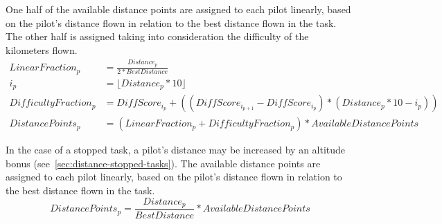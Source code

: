 \documentclass{article}
\begin{document}
\begin{hg}
One half of the available distance points are assigned to each pilot linearly,
based on the pilot’s distance flown in relation to the best distance flown in
the task. The other half is assigned taking into consideration the difficulty
of the kilometers flown.
\begin{align*}
    LinearFraction_p &= \frac{Distance_p}{2 * BestDistance} \\
    i_p &= \lfloor Distance_p * 10 \rfloor \\
    DifficultyFraction_p &= DiffScore_{i_p} + ((DiffScore_{i_{p + 1}} - DiffScore_{i_p}) * (Distance_p * 10 - i_p)) \\
    DistancePoints_p &= (LinearFraction_p + DifficultyFraction_p) * AvailableDistancePoints
\end{align*}
\end{hg}

\begin{pg}
In the case of a stopped task, a pilot’s distance may be increased by an
altitude bonus (see~\ref{sec:distance-stopped-tasks}). The available distance
points are assigned to each pilot linearly, based on the pilot’s distance flown
in relation to the best distance flown in the task.
\[ DistancePoints_p = \frac{Distance_p}{BestDistance} * AvailableDistancePoints \]
\end{pg}
\end{document}
